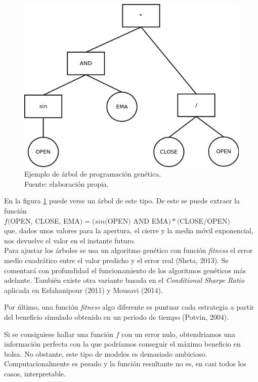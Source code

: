 	\begin{figure}[H]
		\centering
    	\includegraphics[scale=0.5]{imagenes/arbol_inf_comp.png}
    	\caption[Ejemplo de \'arbol de programaci\'on gen\'etica]{Ejemplo de \'arbol de programaci\'on gen\'etica.\\ Fuente: elaboraci\'on propia.}
    	\label{fig:inf_compl}
    \end{figure}
    
    En la figura \ref{fig:inf_compl} puede verse un \'arbol de este tipo. De este se puede extraer la funci\'on \\
    $f($OPEN, CLOSE, EMA$) = (sin($OPEN$)$ AND EMA$) * ($CLOSE/OPEN$)$\\ que, dados unos valores para la apertura, el cierre y la media m\'ovil exponencial, nos devuelve el valor en el instante futuro.\\
    
    Para ajustar los \'arboles se usa un algoritmo gen\'etico con funci\'on \textit{fitness} el error medio cuadr\'atico entre el valor predicho y el error real (Sheta, 2013). Se comentar\'a con profundidad el funcionamiento de los algoritmos gen\'eticos m\'as adelante. Tambi\'en existe otra variante basada en el \textit{Conditional Sharpe Ratio} aplicada en Esfahanipour (2011) y Mousavi (2014).
    
    Por \'ultimo, una funci\'on \textit{fitness} algo diferente es puntuar cada estrategia a partir del beneficio simulado obtenido en un periodo de tiempo (Potvin, 2004).
    
     Si se consiguiese hallar una funci\'on $f$ con un error nulo, obtendriamos una informaci\'on perfecta con la que podr\'iamos conseguir el m\'aximo beneficio en bolsa. No obstante, este tipo de modelos es demasiado ambicioso. Computacionalmente es pesado y la funci\'on resultante no es, en casi todos los casos, interpretable.
     
